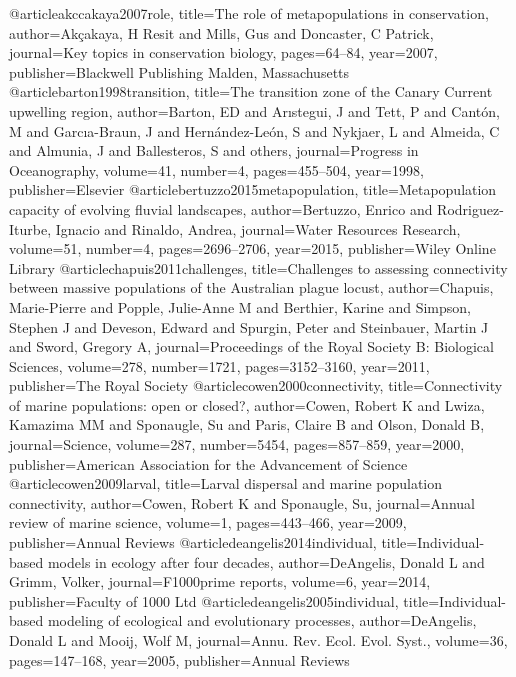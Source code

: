 @article{akccakaya2007role,
  title={The role of metapopulations in conservation},
  author={Ak{\c{c}}akaya, H Resit and Mills, Gus and Doncaster, C Patrick},
  journal={Key topics in conservation biology},
  pages={64--84},
  year={2007},
  publisher={Blackwell Publishing Malden, Massachusetts}
}
@article{barton1998transition,
	title={The transition zone of the Canary Current upwelling region},
	author={Barton, ED and Ar{\i}stegui, J and Tett, P and Cant{\'o}n, M and Garc{\i}a-Braun, J and Hern{\'a}ndez-Le{\'o}n, S and Nykjaer, L and Almeida, C and Almunia, J and Ballesteros, S and others},
	journal={Progress in Oceanography},
	volume={41},
	number={4},
	pages={455--504},
	year={1998},
	publisher={Elsevier}
}
@article{bertuzzo2015metapopulation,
	title={Metapopulation capacity of evolving fluvial landscapes},
	author={Bertuzzo, Enrico and Rodriguez-Iturbe, Ignacio and Rinaldo, Andrea},
	journal={Water Resources Research},
	volume={51},
	number={4},
	pages={2696--2706},
	year={2015},
	publisher={Wiley Online Library}
}
@article{chapuis2011challenges,
	title={Challenges to assessing connectivity between massive populations of the Australian plague locust},
	author={Chapuis, Marie-Pierre and Popple, Julie-Anne M and Berthier, Karine and Simpson, Stephen J and Deveson, Edward and Spurgin, Peter and Steinbauer, Martin J and Sword, Gregory A},
	journal={Proceedings of the Royal Society B: Biological Sciences},
	volume={278},
	number={1721},
	pages={3152--3160},
	year={2011},
	publisher={The Royal Society}
}
@article{cowen2000connectivity,
	title={Connectivity of marine populations: open or closed?},
	author={Cowen, Robert K and Lwiza, Kamazima MM and Sponaugle, Su and Paris, Claire B and Olson, Donald B},
	journal={Science},
	volume={287},
	number={5454},
	pages={857--859},
	year={2000},
	publisher={American Association for the Advancement of Science}
}
@article{cowen2009larval,
	title={Larval dispersal and marine population connectivity},
	author={Cowen, Robert K and Sponaugle, Su},
	journal={Annual review of marine science},
	volume={1},
	pages={443--466},
	year={2009},
	publisher={Annual Reviews}
}
@article{deangelis2014individual,
	title={Individual-based models in ecology after four decades},
	author={DeAngelis, Donald L and Grimm, Volker},
	journal={F1000prime reports},
	volume={6},
	year={2014},
	publisher={Faculty of 1000 Ltd}
}
@article{deangelis2005individual,
	title={Individual-based modeling of ecological and evolutionary processes},
	author={DeAngelis, Donald L and Mooij, Wolf M},
	journal={Annu. Rev. Ecol. Evol. Syst.},
	volume={36},
	pages={147--168},
	year={2005},
	publisher={Annual Reviews}
}
